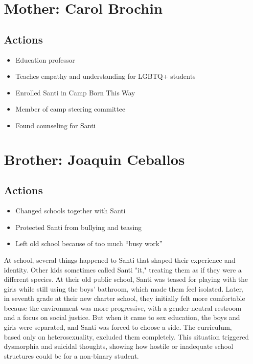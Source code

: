 \documentclass[11pt,a4paper,oneside]{article}
\begin{document}
	
	\section*{Mother: Carol Brochin}
	
	\subsection*{Actions}
	\begin{itemize}
		\item Education professor
		\item Teaches empathy and understanding for LGBTQ+ students
		\item Enrolled Santi in Camp Born This Way
		\item Member of camp steering committee
		\item Found counseling for Santi
	\end{itemize}
	
	
	\section*{Brother: Joaquin Ceballos}
	
	\subsection*{Actions}
	\begin{itemize}
		\item Changed schools together with Santi
		\item Protected Santi from bullying and teasing
		\item Left old school because of too much ``busy work''
	\end{itemize}
	
	\newpage
	
	At school, several things happened to Santi that shaped their experience and identity. Other kids sometimes called Santi "it," treating them as if they were a different species. At their old public school, Santi was teased for playing with the girls while still using the boys’ bathroom, which made them feel isolated. Later, in seventh grade at their new charter school, they initially felt more comfortable because the environment was more progressive, with a gender-neutral restroom and a focus on social justice. But when it came to sex education, the boys and girls were separated, and Santi was forced to choose a side. The curriculum, based only on heterosexuality, excluded them completely. This situation triggered dysmorphia and suicidal thoughts, showing how hostile or inadequate school structures could be for a non-binary student.
	
\end{document}
